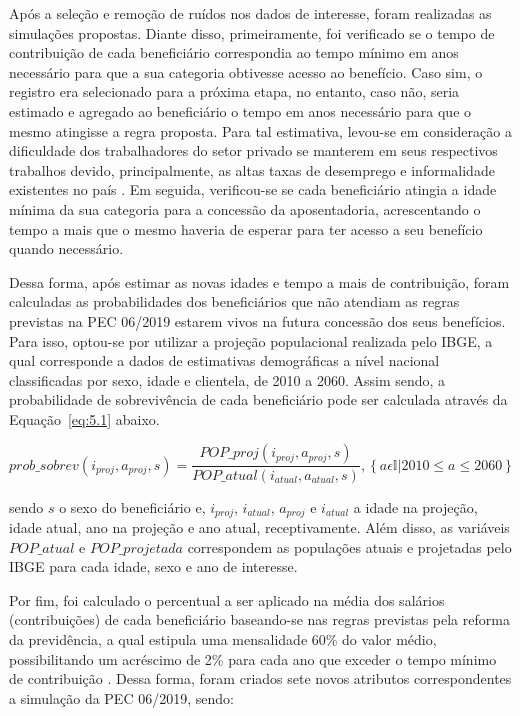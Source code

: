 Após a seleção e remoção de ruídos nos dados de interesse, foram realizadas as simulações propostas. Diante disso, primeiramente, foi verificado se o tempo de contribuição de cada beneficiário correspondia ao tempo mínimo em anos necessário para que a sua categoria obtivesse acesso ao benefício. Caso sim, o registro era selecionado para a próxima etapa, no entanto, caso não, seria estimado e agregado ao beneficiário o tempo em anos necessário para que o mesmo atingisse a regra proposta. Para tal estimativa, levou-se em consideração a dificuldade dos trabalhadores do setor privado se manterem em seus respectivos trabalhos devido, principalmente, as altas taxas de desemprego e informalidade existentes no país \cite{cap04_ref5}. Em seguida, verificou-se se cada beneficiário atingia a idade mínima da sua categoria para a concessão da aposentadoria, acrescentando o tempo a mais que o mesmo haveria de esperar para ter acesso a seu benefício quando necessário.

Dessa forma, após estimar as novas idades e tempo a mais de contribuição, foram calculadas as probabilidades dos beneficiários que não atendiam as regras previstas na PEC 06/2019 estarem vivos na futura concessão dos seus benefícios. Para isso, optou-se por utilizar a projeção populacional realizada pelo IBGE, a qual corresponde a dados de estimativas demográficas a nível nacional classificadas por sexo, idade e clientela, de 2010 a 2060. Assim sendo, a probabilidade de sobrevivência de cada beneficiário pode ser calculada através da Equação~\ref{eq:5.1} abaixo.

\begin{equation}
    prob\_sobrev(i_{proj}, a_{proj}, s) = \frac{POP\_proj(i_{proj}, a_{proj}, s)}{POP\_atual(i_{atual}, a_{atual}, s)}, \left \{a \epsilon \mathbb{I} | 2010 \leq a \leq 2060 \right \}
    \label{eq:5.1}
\end{equation}

\noindent sendo $s$ o sexo do beneficiário e, $i_{proj}$, $i_{atual}$, $a_{proj}$ e $i_{atual}$ a idade na projeção, idade atual, ano na projeção e ano atual, receptivamente. Além disso, as variáveis $POP\_atual$ e $POP\_projetada$ correspondem as populações atuais e projetadas pelo IBGE para cada idade, sexo e ano de interesse.

Por fim, foi calculado o percentual a ser aplicado na média dos salários (contribuições) de cada beneficiário baseando-se nas regras previstas pela reforma da previdência, a qual estipula uma mensalidade 60\% do valor médio, possibilitando um acréscimo de 2\% para cada ano que exceder o tempo mínimo de contribuição . Dessa forma, foram criados sete novos atributos correspondentes a simulação da PEC 06/2019, sendo:

